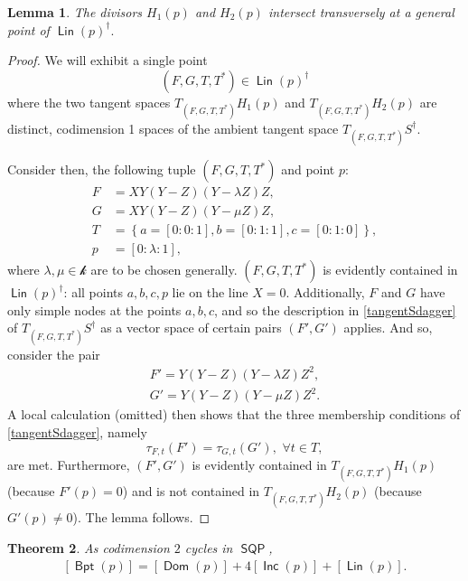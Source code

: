 \documentclass[reqno, 11pt]{amsart}
\theoremstyle{plain}
\newtheorem{theorem}{Theorem}[section]
\newtheorem{lemma}[theorem]{Lemma}
\theoremstyle{remark}
\renewcommand{\k}{\mathscr{k}}
\DeclareMathOperator{\SQP}{\mathsf{SQP}}
\DeclareMathOperator{\BP}{\mathsf{Bpt}}
\DeclareMathOperator{\Dom}{\mathsf{Dom}}
\DeclareMathOperator{\Lin}{\mathsf{Lin}}
\DeclareMathOperator{\Inc}{\mathsf{Inc}}
\begin{document}
\begin{lemma}
    \label{LinTransverse} The divisors $H_{1}(p)$ and $H_{2}(p)$ intersect transversely at a general point of $\Lin(p)^{\dagger}.$
\end{lemma}

\begin{proof}
    We will  exhibit a single point $$(F,G,T,T^{*}) \in \Lin(p)^{\dagger}$$ where the two tangent spaces $T_{(F,G,T,T^{*})}H_{1}(p)$ and $T_{(F,G,T,T^{*})}H_{2}(p)$ are distinct, codimension 1 spaces of the ambient tangent space $T_{(F,G,T,T^{*})}S^{\dagger}$.

    Consider then, the following tuple $(F,G,T,T^{*})$ and point $p$: 
    \begin{align*}
        F & = XY(Y-Z)(Y-\lambda Z)Z, \\
        G & = XY(Y-Z)(Y-\mu Z)Z ,\\
        T & = \left\{a = [0:0:1], b = [0:1:1], c = [0:1:0] \right\},\\
        p & = [0:\lambda:1],
    \end{align*}
    where $\lambda, \mu \in \k$ are to be chosen generally. $(F,G,T,T^{*})$ is evidently contained in $\Lin(p)^\dagger$: all points $a,b,c,p$ lie on the line $X=0$. Additionally, $F$ and $G$ have only simple nodes at the points $a,b,c$, and so the description in \eqref{tangentSdagger} of $T_{(F,G,T,T^{*})}S^{\dagger}$ as a vector space of certain pairs $(F',G')$ applies.   And so, consider the pair 
    \begin{align*}
        F' = Y(Y-Z)(Y-\lambda Z)Z^2,\\
        G' = Y(Y-Z)(Y-\mu Z)Z^{2}.
    \end{align*}
    A local calculation (omitted) then shows that the three membership conditions of \eqref{tangentSdagger}, namely $$\tau_{F,t}(F') = \tau_{G,t}(G'), \,\, \forall t \in T,$$ are met. Furthermore, $(F',G')$ is evidently contained in $T_{(F,G,T,T^{*})}H_{1}(p)$ (because $F'(p)=0$) and is not contained in $T_{(F,G,T,T^{*})}H_{2}(p)$ (because $G'(p) \neq 0$). The lemma follows.  
\end{proof}


    
\begin{theorem}
  \label{theorem:BPdecomposition}
  As codimension $2$ cycles in $\SQP$, 
  \begin{eqnarray}
      \left[\BP(p) \right] = \left[\Dom(p) \right] + 4\left[\Inc(p)
    \right] + \left[\Lin(p) \right].
  \end{eqnarray}
\end{theorem}
\end{document}
